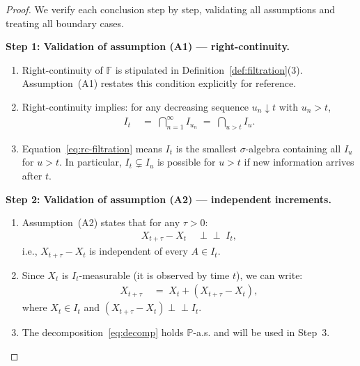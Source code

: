 \documentclass[12pt,openany]{book}
\newcommand{\calI}{\mathcal{I}}
\numberwithin{equation}{chapter}
\theoremstyle{plain}
\theoremstyle{definition}
\theoremstyle{remark}
\numberwithin{equation}{chapter}
\theoremstyle{plain}
\def\calI{I}%
\begin{document}
\begin{proof}
We verify each conclusion step by step, validating all assumptions
and treating all boundary cases.

\medskip
\noindent\textbf{Step 1: Validation of assumption (A1) ---
right-continuity.}
\begin{enumerate}
  \item Right-continuity of $\mathbb{F}$ is stipulated in
        Definition~\ref{def:filtration}(3).  Assumption~(A1)
        restates this condition explicitly for reference.
  \item Right-continuity implies: for any decreasing sequence
        $u_n \downarrow t$ with $u_n > t$,
        \begin{align}
          \calI_t
          &\;=\; \bigcap_{n=1}^{\infty} \calI_{u_n}
          \;=\; \bigcap_{u > t} \calI_u.
          \label{eq:rc-filtration}
        \end{align}
  \item Equation~\eqref{eq:rc-filtration} means $\calI_t$ is the
        smallest $\sigma$-algebra containing all $\calI_u$ for
        $u > t$.  In particular, $\calI_t \subsetneq \calI_u$
        is possible for $u > t$ if new information arrives after
        $t$.
\end{enumerate}

\medskip
\noindent\textbf{Step 2: Validation of assumption (A2) ---
independent increments.}
\begin{enumerate}
  \item Assumption~(A2) states that for any $\tau > 0$:
        \begin{align}
          X_{t+\tau} - X_t
          &\;\perp\!\!\!\perp\; \calI_t,
          \label{eq:indep-inc}
        \end{align}
        i.e., $X_{t+\tau} - X_t$ is independent of every
        $A \in \calI_t$.
  \item Since $X_t$ is $\calI_t$-measurable (it is observed by
        time $t$), we can write:
        \begin{align}
          X_{t+\tau}
          &\;=\; X_t + (X_{t+\tau} - X_t),
          \label{eq:decomp}
        \end{align}
        where $X_t \in \calI_t$ and
        $(X_{t+\tau} - X_t) \perp\!\!\!\perp \calI_t$.
  \item The decomposition~\eqref{eq:decomp} holds $\mathbb{P}$-a.s.
        and will be used in Step~3.
\end{enumerate}


\end{proof}
\end{document}
